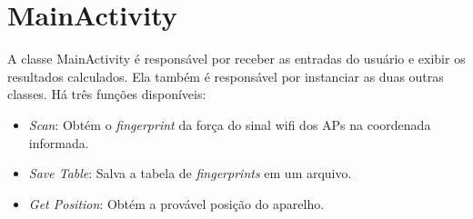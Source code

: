   \section{MainActivity}
  A classe MainActivity é responsável por receber as entradas do usuário e exibir os resultados calculados.
  Ela também é responsável por instanciar as duas outras classes. Há três funções disponíveis: 
  \begin{itemize}
   \item \textit{Scan}: Obtém o \textit{fingerprint} da força do sinal wifi dos APs na coordenada informada.
   \item \textit{Save Table}: Salva a tabela de \textit{fingerprints} em um arquivo.
   \item \textit{Get Position}: Obtém a provável posição do aparelho. 
  \end{itemize}

